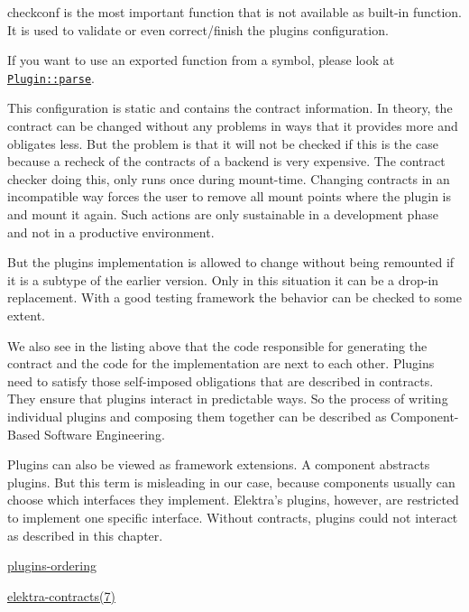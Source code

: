 {\ttfamily checkconf} is the most important function that is not available as built-\/in function. It is used to validate or even correct/finish the plugin\textquotesingle{}s configuration.

If you want to use an exported function from a symbol, please look at \href{/home/jenkins/workspace/libelektra-release/src/libs/tools/src/plugin.cpp}{\tt Plugin\+::parse}.

This configuration is static and contains the contract information. In theory, the contract can be changed without any problems in ways that it provides more and obligates less. But the problem is that it will not be checked if this is the case because a recheck of the contracts of a backend is very expensive. The contract checker doing this, only runs once during mount-\/time. Changing contracts in an incompatible way forces the user to remove all mount points where the plugin is and mount it again. Such actions are only sustainable in a development phase and not in a productive environment.

But the plugin\textquotesingle{}s implementation is allowed to change without being remounted if it is a subtype of the earlier version. Only in this situation it can be a drop-\/in replacement. With a good testing framework the behavior can be checked to some extent.

We also see in the listing above that the code responsible for generating the contract and the code for the implementation are next to each other. Plugins need to satisfy those self-\/imposed obligations that are described in contracts. They ensure that plugins interact in predictable ways. So the process of writing individual plugins and composing them together can be described as Component-\/\+Based Software Engineering.

Plugins can also be viewed as framework extensions. A component abstracts plugins. But this term is misleading in our case, because components usually can choose which interfaces they implement. Elektra’s plugins, however, are restricted to implement one specific interface. Without contracts, plugins could not interact as described in this chapter.


\begin{DoxyItemize}
\item \hyperlink{doc_dev_plugins-ordering_md}{plugins-\/ordering}
\item \hyperlink{doc_help_elektra-contracts_md}{elektra-\/contracts(7)} 
\end{DoxyItemize}